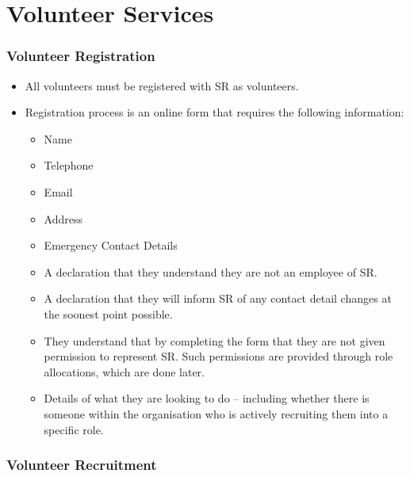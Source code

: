 \chapter{Volunteer Services}



\subsection{Volunteer Registration}

\begin{itemize}
\item All volunteers must be registered with SR as volunteers.
\item Registration process is an online form that requires the following information:
  \begin{itemize}
  \item Name
  \item Telephone
  \item Email
  \item Address
  \item Emergency Contact Details
  \item A declaration that they understand they are not an employee of SR.
  \item A declaration that they will inform SR of any contact detail changes at the soonest point possible.
  \item They understand that by completing the form that they are not given permission to represent SR.  Such permissions are provided through role allocations, which are done later.
  \item Details of what they are looking to do -- including whether there is someone within the organisation who is actively recruiting them into a specific role.
  \end{itemize}
\end{itemize}

\subsection{Volunteer Recruitment}


